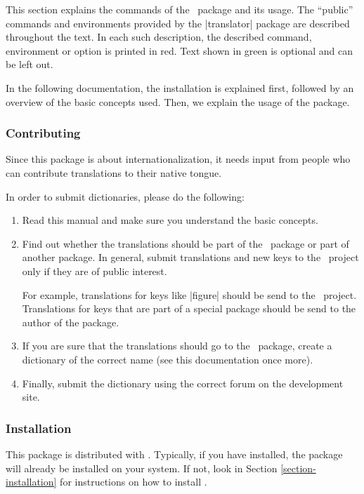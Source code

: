 This section explains the commands of the \translatorname\ package and its usage. The ``public'' commands and environments provided by the |translator| package are described throughout the text. In each such description, the described command, environment or option is printed in red. Text shown in green is optional and can be left out.

In the following documentation, the installation is explained first, followed by an overview of the basic concepts used. Then, we explain the usage of the package.

\subsubsection{Contributing}

Since this package is about internationalization, it needs input from people who can contribute translations to their native tongue.

In order to submit dictionaries, please do the following:
\begin{enumerate}
  \item Read this manual and make sure you understand the basic concepts.
  \item Find out whether the translations should be part of the \translatorname\ package or part of another package. In general, submit translations and new keys to the \translatorname\ project only if they are of public interest.

  For example, translations for keys like |figure| should be send to the \translatorname\ project. Translations for keys that are part of a special package should be send to the author of the package.
  \item If you are sure that the translations should go to the \translatorname\ package, create a dictionary of the correct name (see this documentation once more).
  \item Finally, submit the dictionary using the correct forum on the development site. 
\end{enumerate}

\subsubsection{Installation}

This package is distributed with \beamer. Typically, if you have \beamer installed, the package will already be installed on your system. If not, look in Section \ref{section-installation} for instructions on how to install \beamer.


